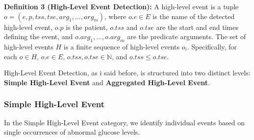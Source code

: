 \documentclass{article}
\begin{document}
\textbf{Definition 3 (High-Level Event Detection):} A high-level event is a tuple \( o = (e, p, tss, tse, arg_1, \ldots, arg_m) \), where \( o.e \in E \) is the name of the detected high-level event, \( o.p \) is the patient, \( o.tss \) and \( o.tse \) are the start and end times defining the event, and \( o.arg_1, \ldots, o.arg_m \) are the predicate arguments. The set of high-level events \( H \) is a finite sequence of high-level events \( o_i \). Specifically, for each \( o \in H \), \( o.e \in E \), \( o.tss, o.tse \in \mathbb{N} \), and \( o.tss \leq o.tse \).

High-Level Event Detection, as i said before, is structured into two distinct levels: \textbf{Simple High-Level Event} and \textbf{Aggregated High-Level Event}.

\subsubsection{Simple High-Level Event}

In the Simple High-Level Event category, we identify individual events based on single occurrences of abnormal glucose levels.
\end{document}
